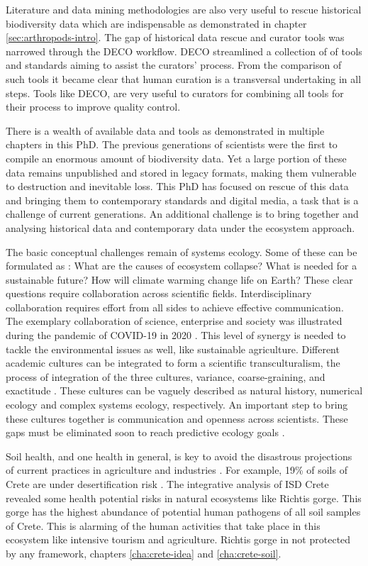 Literature and data mining 
methodologies are also very useful to rescue historical biodiversity data which are
indispensable as demonstrated in chapter \ref{sec:arthropods-intro}.
The gap of historical data rescue and curator tools was narrowed
through the DECO workflow. DECO streamlined a collection of 
of tools and standards aiming to assist the curators' process. From the comparison
of such tools it became clear that human curation is a transversal undertaking in all steps.
Tools like DECO, are very useful to curators for combining all tools for their process 
to improve quality control.

There is a wealth of available data and tools as demonstrated in 
multiple chapters in this PhD. 
The previous generations of scientists were the first to 
compile an enormous amount of biodiversity data.
Yet a large portion of these data remains unpublished and stored in legacy formats,
making them vulnerable to destruction and inevitable loss.
This PhD has focused on rescue of this data and bringing them to contemporary standards and digital media,
a task that is a challenge of current generations. 
An additional challenge is to bring together and analysing historical data
and contemporary data under the ecosystem approach.

The basic conceptual challenges remain of systems ecology. 
Some of these can be formulated as : What are the causes of ecosystem collapse?
What is needed for a sustainable future?
How will climate warming change life on Earth?
These clear questions require collaboration across scientific fields. 
Interdisciplinary collaboration requires effort from all sides to 
achieve effective communication. 
The exemplary collaboration of science, enterprise and society was
illustrated during the pandemic of COVID-19 in 2020 \parencite{ioannidis2021the-rapid,lee2021scientific}. 
This level of synergy is needed to tackle the environmental issues
as well, like sustainable agriculture.
Different academic cultures can be integrated to form a scientific transculturalism,
the process of integration of the three cultures, variance, coarse-graining, and exactitude \parencite{Enquist_2024}.
These cultures can be vaguely described as natural history, numerical ecology and complex systems ecology, respectively.
An important step to bring these cultures together is communication and openness across scientists.
These gaps must be eliminated soon to reach predictive ecology goals \parencite{mouquet_review_2015}.

Soil health,
and one health in general, is key to avoid the disastrous projections of
current practices in agriculture and industries \parencite{banerjee2023Soil}.
For example, 19\% of soils of Crete are under desertification risk \parencite{KARAMESOUTI2018266}.
The integrative analysis of ISD Crete revealed some health potential risks in 
natural ecosystems like Richtis gorge. This gorge has the highest abundance of 
potential human pathogens of all soil samples of Crete. This is alarming of 
the human activities that take place in this ecosystem like intensive tourism 
and agriculture. Richtis gorge in not protected by any framework, chapters \ref{cha:crete-idea} and \ref{cha:crete-soil}.

